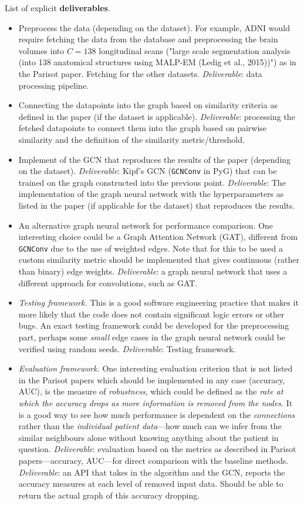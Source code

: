 \documentclass[12pt,a4paper,twoside]{article}
\begin{document}
List of explicit \textbf{deliverables}.
\begin{itemize}
  \item Preprocess the data (depending on the dataset). For example, ADNI would require fetching the data from the database and preprocessing the brain volumes into $C=138$ longitudinal scans ("large scale segmentation analysis (into 138 anatomical structures using MALP-EM (Ledig et al., 2015))") as in the Parisot paper. Fetching for the other datasets. \textit{Deliverable}: data processing pipeline.
  \item Connecting the datapoints into the graph based on similarity criteria as defined in the paper (if the dataset is applicable). \textit{Deliverable}: processing the fetched datapoints to connect them into the graph based on pairwise similarity and the definition of the similarity metric/threshold.
  \item Implement of the GCN that reproduces the results of the paper (depending on the dataset). \textit{Deliverable}: Kipf's GCN (\texttt{GCNConv} in PyG) that can be trained on the graph constructed into the previous point. \textit{Deliverable}: The implementation of the graph neural network with the hyperparameters as listed in the paper (if applicable for the dataset) that reproduces the results.
  \item An alternative graph neural network for performance comparison. One interesting choice could be a Graph Attention Network (GAT), different from \texttt{GCNConv} due to the use of weighted edges. Note that for this to be used a custom similarity metric should be implemented that gives continuous (rather than binary) edge weights. \textit{Deliverable}: a graph neural network that uses a different approach for convolutions, such as GAT.
  \item \textit{Testing framework.} This is a good software engineering practice that makes it more likely that the code does not contain significant logic errors or other bugs. An exact testing framework could be developed for the preprocessing part, perhaps some \textit{small} edge cases in the graph neural network could be verified using random seeds. \textit{Deliverable}: Testing framework.
  \item \textit{Evaluation framework.} One interesting evaluation criterion that is not listed in the Parisot papers which should be implemented in any case (accuracy, AUC), is the measure of \textit{robustness}, which could be defined as the \textit{rate at which the accuracy drops as more information is removed from the nodes}. It is a good way to see how much performance is dependent on the \textit{connections} rather than the \textit{individual patient data}—how much can we infer from the similar neighbours alone without knowing anything about the patient in question. \textit{Deliverable}: evaluation based on the metrics as described in Parisot papers—accuracy, AUC—for direct comparison with the baseline methods. \textit{Deliverable}: an API that takes in the algorithm and the GCN, reports the accuracy measures at each level of removed input data. Should be able to return the actual graph of this accuracy dropping.

\end{itemize}
\end{document}
